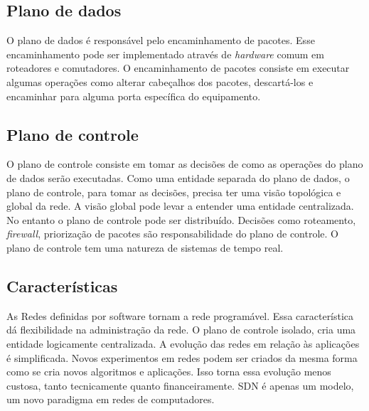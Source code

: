 \subsection{Plano de dados}

O plano de dados é responsável pelo encaminhamento de pacotes. 
Esse encaminhamento pode ser implementado através de \emph{hardware} 
comum em roteadores e comutadores. 
O encaminhamento de pacotes consiste em executar algumas operações 
como alterar cabeçalhos dos pacotes, descartá-los e encaminhar para alguma 
porta específica do equipamento.

\subsection{Plano de controle}

O plano de controle consiste em tomar as decisões de como as operações do 
plano de dados serão executadas.
Como uma entidade separada do plano de dados, o plano de controle, para 
tomar as decisões, precisa ter uma visão topológica e global da rede. 
A visão global pode levar a entender uma entidade centralizada. 
No entanto o plano de controle pode ser distribuído. 
Decisões como roteamento, \emph{firewall}, priorização de pacotes são 
responsabilidade do plano de controle.
O plano de controle tem uma natureza de sistemas de tempo real.

\subsection{Características}

As Redes definidas por software tornam a rede programável.
Essa característica dá flexibilidade na administração da rede.
O plano de controle isolado, cria uma entidade logicamente centralizada.
A evolução das redes em relação às aplicações é simplificada. 
Novos experimentos em redes podem ser criados da mesma forma como se cria 
novos algoritmos e aplicações.
Isso torna essa evolução menos custosa, tanto tecnicamente 
quanto financeiramente.
SDN é apenas um modelo, um novo paradigma em redes de computadores.
